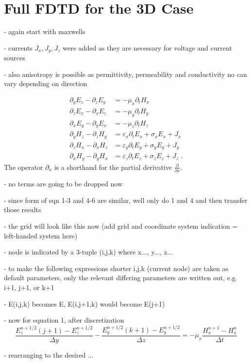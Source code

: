 \documentclass[]{report}
\begin{document}
\section{Full FDTD for the 3D Case}
- again start with maxwells

- currents \( J_x, J_y, J_z \) were added as they are necessary for voltage and current sources

- also anisotropy is possible as permittivity, permeability and conductivity no can vary depending on direction

\begin{align}
	\partial_y E_z - \partial_z E_y &= -\mu_x \partial_t H_x \\
	\partial_z E_x - \partial_x E_z &= -\mu_y \partial_t H_y \\
	\partial_x E_y - \partial_y E_x &= -\mu_z \partial_t H_z \\
	\partial_y H_z - \partial_z H_y &= \varepsilon_x \partial_t E_x + \sigma_x E_x + J_x \\
	\partial_z H_x - \partial_x H_z &= \varepsilon_y \partial_t E_y + \sigma_y E_y + J_y \\
	\partial_x H_y - \partial_y H_x &= \varepsilon_z \partial_t E_z + \sigma_z E_z + J_z \text{ .}
\end{align}
The operator \( \partial_x \) is a shorthand for the partial derivative \( \frac{\partial}{\partial x} \).

- no terms are going to be dropped now

- since form of eqn 1-3 and 4-6 are similar, well only do 1 and 4 and then transfer those results

- the grid will look like this now (add grid and coordinate system indication = left-handed system here)

- node is indicated by a 3-tuple (i,j,k) where x..., y..., z...

- to make the following expressions shorter i,j,k (current node) are taken as default parameters, only the relevant differing parameters are written out, e.g. i+1, j+1, or k+1

- E(i,j,k) becomes E, E(i,j+1,k) would become E(j+1)

- now for equation 1, after discretization
\begin{equation}
	\frac{E_z^{n+1/2}(j+1) - E_z^{n+1/2}}{\Delta y} - \frac{E_y^{n+1/2}(k+1) - E_y^{n+1/2}}{\Delta z} = -\mu_x \frac{H_x^{n+1}-H_x^n}{\Delta t}
\end{equation}

- rearranging to the desired ...
\end{document}

